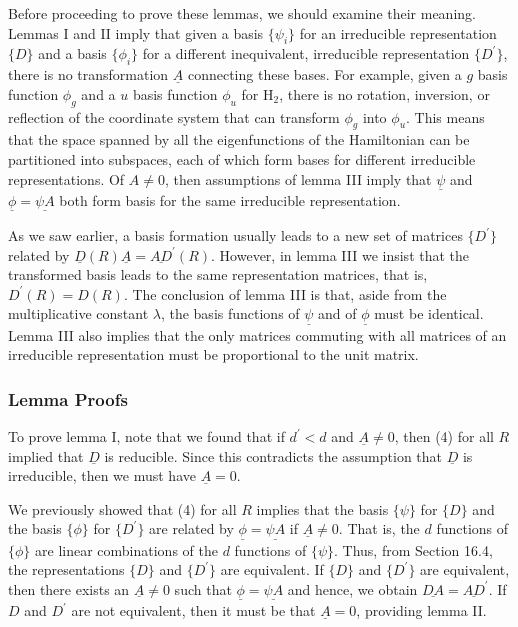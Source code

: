 Before proceeding to prove these lemmas, we should examine their 
meaning.  Lemmas I and II imply that given a basis $\{\psi_i\}$ for an
irreducible representation $\{D\}$ and a basis $\{\phi_i\}$ for a 
different inequivalent, irreducible representation $\{D^{\prime}\}$, 
there is no transformation $\underline{A}$ connecting these bases.  
For example, given a $g$ basis function $\phi_g$ and a $u$ basis 
function $\phi_u$ for H$_2$, there is no rotation, inversion, or 
reflection of the coordinate system that can transform $\phi_g$ 
into $\phi_u$.  This means that the space spanned by all the 
eigenfunctions of the Hamiltonian can be partitioned into subspaces, 
each of which form bases for different irreducible representations.  
Of $A \not= 0$, then assumptions of lemma III imply that 
$\underline{\psi}$ and $\underline{\phi} = \underline{\psi A}$ both 
form basis for the same irreducible representation.

As we saw earlier, a basis formation usually leads to a new set of 
matrices $\{D^{\prime}\}$ related by $\underline{D}(R) 
\underline{A} = \underline{AD}^{\prime}(R)$.  However, in lemma III 
we insist that the transformed basis leads to the same representation 
matrices, that is, $D^{\prime}(R) = D(R)$.  The conclusion of lemma 
III is that, aside from the multiplicative constant $\lambda$, the 
basis functions of $\underline{\psi}$ and of $\underline{\phi}$ must 
be identical.  Lemma III also implies that the only matrices commuting 
with all matrices of an irreducible representation must be 
proportional to the unit matrix.

\subsubsection{Lemma Proofs}

To prove lemma I, note that we found that if $d^{\prime} < d$ and 
$\underline{A} \not= 0$, then (4) for all $R$ implied that 
$\underline{D}$ is reducible.  Since this contradicts the assumption 
that $\underline{D}$ is irreducible, then we must have 
$\underline{A} = 0$. 

We previously showed that (4) for all $R$ implies that the basis $\{ 
\psi\}$ for $\{D\}$ and the basis $\{\phi\}$ for $\{D^{\prime}\}$ are 
related by $\underline{\phi} = \underline{\psi A}$ if $\underline{A} \not= 
0$.  That is, the $d$ functions of $\{\phi\}$ are linear combinations 
of the $d$ functions of $\{\psi\}$.  Thus, from Section 16.4, the 
representations $\{D\}$ and $\{D^{\prime}\}$ are equivalent.  If 
$\{D\}$ and $\{D^{\prime}\}$ are equivalent, then there exists an 
$\underline{A} \not= 0$ such that $\underline{\phi} = \underline{\psi 
A}$ and hence, we obtain $\underline{DA} = \underline{AD}^{\prime}$.  
If $D$ and $D^{\prime}$ are not equivalent, then it must be that 
$\underline{A} = 0$, providing lemma II.

